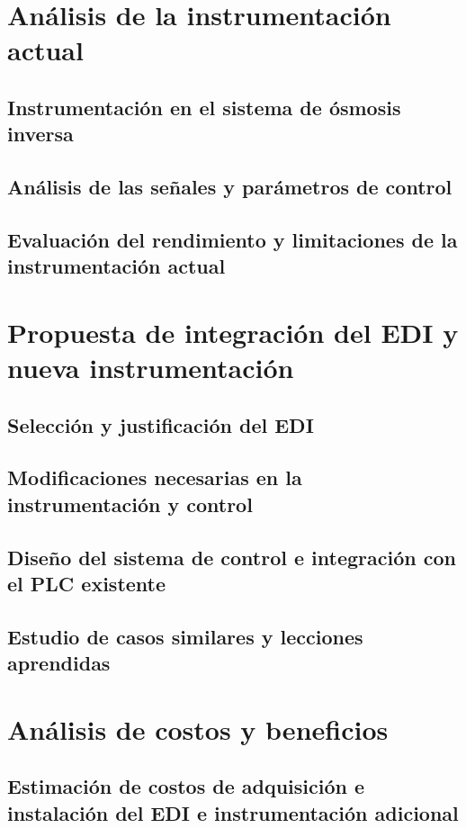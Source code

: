 \documentclass[
	spanish, %
	letterpaper, oneside
]{book}
\begin{document}



\chapter{Análisis de la instrumentación actual}
\section{Instrumentación en el sistema de ósmosis inversa}
\section{Análisis de las señales y parámetros de control}
\section{Evaluación del rendimiento y limitaciones de la instrumentación actual}


\chapter{Propuesta de integración del EDI y nueva instrumentación}
\section{Selección y justificación del EDI}
\section{Modificaciones necesarias en la instrumentación y control}
\section{Diseño del sistema de control e integración con el PLC existente}
\section{Estudio de casos similares y lecciones aprendidas}

\chapter{Análisis de costos y beneficios}
\section{Estimación de costos de adquisición e instalación del EDI e instrumentación adicional}
\end{document}

